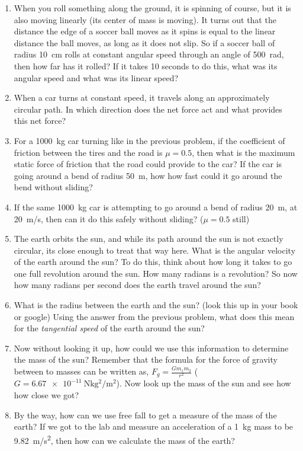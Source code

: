 \begin{enumerate}
	\item When you roll something along the ground, it is spinning of course, but it is also moving linearly (its center of mass is moving). It turns out that the distance the edge of a soccer ball moves as it spins is equal to the linear distance the ball moves, as long as it does not slip. So if a soccer ball of radius \SI{10}{cm} rolls at constant angular speed through an angle of \SI{500}{\radian}, then how far has it rolled? If it takes 10 seconds to do this, what was its angular speed and what was its linear speed?
	
	\item When a car turns at constant speed, it travels along an approximately circular path. In which direction does the net force act and what provides this net force?
	
	\item For a \SI{1000}{kg} car turning like in the previous problem, if the coefficient of friction between the tires and the road is $\mu=0.5$, then what is the maximum static force of friction that the road could provide to the car? If the car is going around a bend of radius \SI{50}{\meter}, how how fast could it go around the bend without sliding?
	
	\item If the same \SI{1000}{\kilogram} car is attempting to go around a bend of radius \SI{20}{\meter}, at \SI{20}{m/s}, then can it do this safely without sliding? ($\mu = 0.5$ still)
	
	\item The earth orbits the sun, and while its path around the sun is not exactly circular, its close enough to treat that way here. What is the angular velocity of the earth around the sun? To do this, think about how long it takes to go one full revolution around the sun. How many radians is a revolution? So now how many radians per second does the earth travel around the sun? 
	\item What is the radius between the earth and the sun? (look this up in your book or google) Using the answer from the previous problem, what does this mean for the \emph{tangential speed} of the earth around the sun?
	\item Now without looking it up, how could we use this information to determine the mass of the sun?  Remember that the formula for the force of gravity between to masses can be written as, $F_g=\frac{G m_1 m_2}{r^2}$ ($G=\SI{6.67e-11}{\newton \kilogram^2/\meter^2}$). Now look up the mass of the sun and see how how close we got?
	\item By the way, how can we use free fall to get a measure of the mass of the earth? If we got to the lab and measure an acceleration of a \SI{1}{\kilogram} mass to be \SI{9.82}{m/s^2}, then how can we calculate the mass of the earth?
	

\end{enumerate}
